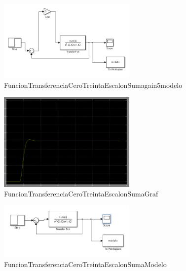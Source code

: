 \documentclass[]{article}
\begin{document}
\begin{figure}[h!]
	\centering
	\includegraphics[width=0.6\textwidth]{Imagenes/FuncionTransferenciaCeroTreintaEscalonSumagain5modelo}
	\caption{FuncionTransferenciaCeroTreintaEscalonSumagain5modelo}
	\label{fig:FuncionTransferenciaCeroTreintaEscalonSumagain5modelo}
\end{figure}

\begin{figure}[h!]
	\centering
	\includegraphics[width=0.6\textwidth]{Imagenes/FuncionTransferenciaCeroTreintaEscalonSumaGraf}
	\caption{FuncionTransferenciaCeroTreintaEscalonSumaGraf}
	\label{fig:FuncionTransferenciaCeroTreintaEscalonSumaGraf}
\end{figure}

\begin{figure}[h!]
	\centering
	\includegraphics[width=0.6\textwidth]{Imagenes/FuncionTransferenciaCeroTreintaEscalonSumaModelo}
	\caption{FuncionTransferenciaCeroTreintaEscalonSumaModelo}
	\label{fig:FuncionTransferenciaCeroTreintaEscalonSumaModelo}
\end{figure}
\end{document}
